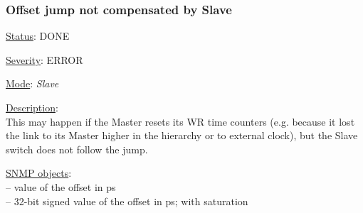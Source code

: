 \subsubsection{\bf Offset jump not compensated by Slave}
		\label{fail:timing:offset_jump}
		\begin{pck_descr}
			\item [] \underline{Status}: DONE
			\item [] \underline{Severity}: ERROR
			\item [] \underline{Mode}: \emph{Slave}
			\item [] \underline{Description}:\\
				This may happen if the Master resets its WR time counters (e.g. because
        it lost the link to its Master higher in the hierarchy or to external
				clock), but the Slave switch does not follow the jump.
			\item [] \underline{SNMP objects}:\\
        {\footnotesize
				 -- value of the offset in ps\\
				 -- 32-bit signed value of the offset in ps; with saturation\\
				\\
				 \\
				 \\
         }
		\end{pck_descr}

